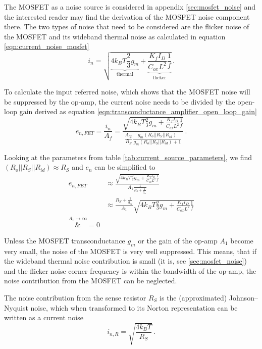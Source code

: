 The MOSFET as a noise source is considered in appendix \ref{sec:mosfet_noise} and the interested reader may find the derivation of the MOSFET noise component there. The two types of noise that need to be considered are the flicker noise of the MOSFET and its wideband thermal noise as calculated in equation \ref{eqn:current_noise_mosfet}
\begin{equation*}
    i_{n} = \sqrt{\underbrace{4 k_B T \frac{2}{3} g_m}_{\text{thermal}} + \underbrace{\frac{K_f I_D}{C_{ox} L^2} \frac{1}{f}}_{\text{flicker}}} \,.
\end{equation*}

To calculate the input referred noise, which shows that the MOSFET noise will be suppressed by the op-amp, the current noise needs to be divided by the open-loop gain derived as equation \ref{eqn:transconductance_amplifier_open_loop_gain}
\begin{equation}
    e_{n,FET} = \frac{i_n}{A_f} = \frac{\sqrt{4 k_B T \frac{2}{3} g_m + \frac{K_f I_D}{C_{ox} L^2} \frac{1}{f}}}{\frac{A_{op}}{R_S} \frac{g_m \left(R_o || R_S || R_{id}\right)}{g_m \left(R_o || R_S || R_{id}\right) + 1}} \,.
\end{equation}

Looking at the parameters from table \ref{tab:current_source_parameters}, we find $\left(R_o || R_S || R_{id}\right) \approx R_S$ and $e_n$ can be simplified to
\begin{align*}
    e_{n,FET} &\approx \frac{\sqrt{4 k_B T \frac{2}{3} g_m + \frac{K_f I_D}{C_{ox} L^2} \frac{1}{f}}}{A_1 \frac{1}{R_S + \frac{1}{g_m}}}\\
    &\approx \frac{R_S + \frac{1}{g_m}}{A_1} \sqrt{4 k_B T \frac{2}{3} g_m + \frac{K_f I_D}{C_{ox} L^2} \frac{1}{f}}\\
    \overset{A_1 \to \infty}&{=} 0
\end{align*}

Unless the MOSFET transconductance $g_m$ or the gain of the op-amp $A_1$ become very small, the noise of the MOSFET is very well suppressed. This means, that if the wideband thermal noise contribution is small (it is, see \ref{sec:mosfet_noise}) and the flicker noise corner frequency is within the bandwidth of the op-amp, the noise contribution from the MOSFET can be neglected.

The noise contribution from the sense resistor $R_S$ is the (approximated) Johnson–Nyquist noise, which when transformed to its Norton representation can be written as a current noise
\begin{equation}
    i_{n,R} = \sqrt{\frac{4 k_B T}{R_S}} \label{eqn:current_noise_resistor}\,.
\end{equation}

